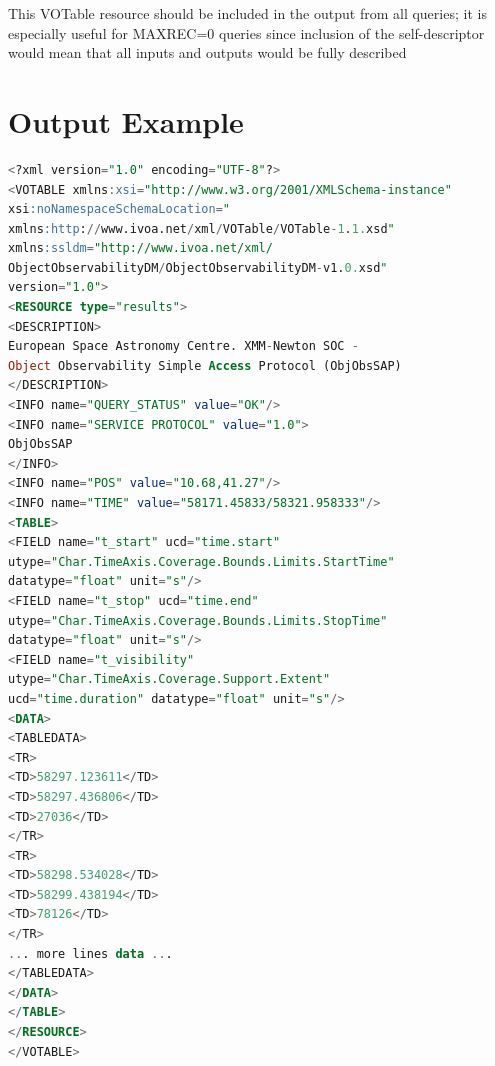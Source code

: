 \documentclass[11pt,a4paper]{ivoatex/ivoa}
\begin{document}
This VOTable resource should be included in the output from all queries;
it is especially useful for MAXREC=0 queries since inclusion of the
self-descriptor would mean that all inputs and outputs would be fully
described

\section{Output Example}
\begin{lstlisting}[language=SQL]
<?xml version="1.0" encoding="UTF-8"?>
<VOTABLE xmlns:xsi="http://www.w3.org/2001/XMLSchema-instance"
xsi:noNamespaceSchemaLocation="
xmlns:http://www.ivoa.net/xml/VOTable/VOTable-1.1.xsd"
xmlns:ssldm="http://www.ivoa.net/xml/
ObjectObservabilityDM/ObjectObservabilityDM-v1.0.xsd"
version="1.0">
<RESOURCE type="results">
<DESCRIPTION>
European Space Astronomy Centre. XMM-Newton SOC -
Object Observability Simple Access Protocol (ObjObsSAP)
</DESCRIPTION>
<INFO name="QUERY_STATUS" value="OK"/>
<INFO name="SERVICE PROTOCOL" value="1.0">
ObjObsSAP
</INFO>
<INFO name="POS" value="10.68,41.27"/>
<INFO name="TIME" value="58171.45833/58321.958333"/>
<TABLE>
<FIELD name="t_start" ucd="time.start"
utype="Char.TimeAxis.Coverage.Bounds.Limits.StartTime"
datatype="float" unit="s"/>
<FIELD name="t_stop" ucd="time.end"
utype="Char.TimeAxis.Coverage.Bounds.Limits.StopTime"
datatype="float" unit="s"/>
<FIELD name="t_visibility"
utype="Char.TimeAxis.Coverage.Support.Extent"
ucd="time.duration" datatype="float" unit="s"/>
<DATA>
<TABLEDATA>
<TR>
<TD>58297.123611</TD>
<TD>58297.436806</TD>
<TD>27036</TD>
</TR>
<TR>
<TD>58298.534028</TD>
<TD>58299.438194</TD>
<TD>78126</TD>
</TR>
... more lines data ...
</TABLEDATA>
</DATA>
</TABLE>
</RESOURCE>
</VOTABLE>
\end{lstlisting}

\appendix
\renewcommand{\thesection}{\Alph{section}.\arabic{section}}
\setcounter{section}{0}
\end{document}
